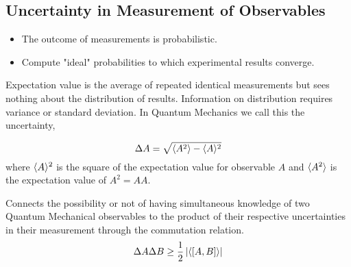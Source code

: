 \documentclass[english, 11pt]{article}
\begin{document}
    \subsection{Uncertainty in Measurement of Observables}

      \begin{itemize}
        \item The outcome of measurements is probabilistic.
        \item Compute "ideal" probabilities to which experimental results converge.
      \end{itemize}

      Expectation value is the average of repeated identical measurements but sees nothing about the distribution of results. Information on distribution requires variance or standard deviation. In Quantum Mechanics we call this the uncertainty,

      \begin{defn}[uncertainty]\label{uncertainty}
      \[ \Delta A = \sqrt{\langle A^2 \rangle - \langle A \rangle^2} \]
      where $\langle A \rangle^2$ is the square of the expectation value for observable $A$ and $\langle A^2 \rangle$ is the expectation value of $A^2 = AA$.
      \end{defn}

      \begin{defn}\label{Uncertainty Principle}
        Connects the possibility or not of having simultaneous knowledge of two Quantum Mechanical observables to the product of their respective uncertainties in their measurement through the commutation relation.
        \[ \Delta A \Delta B \geq \frac{1}{2} \left| \langle [A,B] \rangle \right| \]
      \end{defn}
\end{document}
